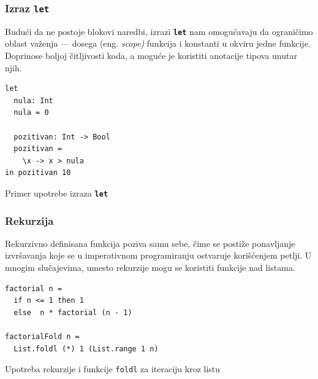 \documentclass[12pt,oneside]{memoir}
\begin{document}
\subsubsection{Izraz \texttt{\textbf{let}}}
Budući da ne postoje blokovi naredbi, izrazi \texttt{\textbf{let}} nam omogućavaju da 
ograničimo oblast važenja --- dosega (eng. \emph{scope)} funkcija i konstanti u okviru
jedne funkcije. Doprinose boljoj čitljivosti koda, a moguće je koristiti anotacije tipova
unutar njih.
\begin{listing}[h]
\begin{verbatim}
let
  nula: Int
  nula = 0
  
  pozitivan: Int -> Bool
  pozitivan =
    \x -> x > nula
in pozitivan 10
\end{verbatim}
\caption{Primer upotrebe izraza \texttt{\textbf{let}}}
\end{listing}
\subsubsection{Rekurzija}
Rekurzivno definisana funkcija poziva samu sebe, čime se postiže ponavljanje izvršavanja
koje se u imperativnom programiranju ostvaruje korišćenjem petlji. U mnogim slučajevima,
umesto rekurzije mogu se koristiti funkcije nad listama.
\begin{listing}[h]
\begin{verbatim}
factorial n = 
  if n <= 1 then 1 
  else  n * factorial (n - 1)

factorialFold n = 
  List.foldl (*) 1 (List.range 1 n) 
\end{verbatim}
\caption{Upotreba rekurzije i funkcije \texttt{foldl} za iteraciju kroz listu}
\end{listing}
\end{document}
